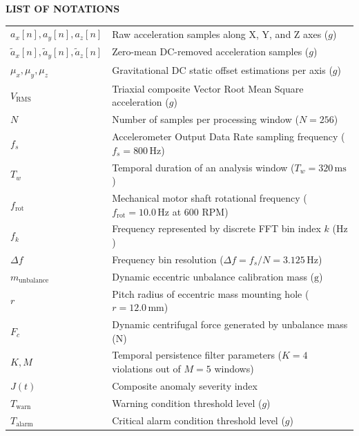 \begin{center}
\textbf{\fontsize{16}{32}\selectfont LIST OF NOTATIONS}
\end{center}
\vspace{1em}

\noindent
\begin{tabular}{ll}
$a_x[n], a_y[n], a_z[n]$ & Raw acceleration samples along X, Y, and Z axes ($g$) \\
$\tilde{a}_x[n], \tilde{a}_y[n], \tilde{a}_z[n]$ & Zero-mean DC-removed acceleration samples ($g$) \\
$\mu_x, \mu_y, \mu_z$ & Gravitational DC static offset estimations per axis ($g$) \\
$V_{\mathrm{RMS}}$ & Triaxial composite Vector Root Mean Square acceleration ($g$) \\
$N$ & Number of samples per processing window ($N = 256$) \\
$f_s$ & Accelerometer Output Data Rate sampling frequency ($f_s = 800\,\text{Hz}$) \\
$T_w$ & Temporal duration of an analysis window ($T_w = 320\,\text{ms}$) \\
$f_{\mathrm{rot}}$ & Mechanical motor shaft rotational frequency ($f_{\mathrm{rot}} = 10.0\,\text{Hz}$ at 600 RPM) \\
$f_k$ & Frequency represented by discrete FFT bin index $k$ ($\text{Hz}$) \\
$\Delta f$ & Frequency bin resolution ($\Delta f = f_s / N = 3.125\,\text{Hz}$) \\
$m_{\mathrm{unbalance}}$ & Dynamic eccentric unbalance calibration mass ($\text{g}$) \\
$r$ & Pitch radius of eccentric mass mounting hole ($r = 12.0\,\text{mm}$) \\
$F_c$ & Dynamic centrifugal force generated by unbalance mass ($\text{N}$) \\
$K, M$ & Temporal persistence filter parameters ($K = 4$ violations out of $M = 5$ windows) \\
$J(t)$ & Composite anomaly severity index \\
$T_{\mathrm{warn}}$ & Warning condition threshold level ($g$) \\
$T_{\mathrm{alarm}}$ & Critical alarm condition threshold level ($g$) \\
\end{tabular}
\clearpage
